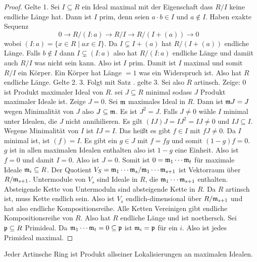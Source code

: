 \begin{proof}
    Gelte 1. Sei \(I\subseteq R\) ein Ideal maximal mit der Eigenschaft dass \(R/I\) keine endliche Länge hat. Dann ist \(I\) prim, denn seien \(a\cdot b\in I\) und \(a\not\in I\). Haben exakte Sequenz
    \[0\to R/(I:a)\to R/I\to R/(I+(a))\to 0\] wobei \((I:a)=\{x\in R\mid ax\in I\}\). Da \(I\subsetneq I+(a)\) hat \(R/(I+(a))\) endliche Länge. Falls \(b\not\in I\) dann \(I\subsetneq (I:a)\) also hat \(R/(I:a)\) endliche Länge und damiit auch \(R/I\) was nicht sein kann. Also ist \(I\) prim. Damit ist \(I\) maximal und somit \(R/I\) ein Körper. Ein Körper hat Länge \(=1\) was ein Widerspruch ist.
    Also hat \(R\) endliche Länge.
    Gelte 2. 3. Folgt mit Satz . gelte 3. Sei also \(R\) artinsch. Zeige: \(0\) ist Produkt maximaler Ideal von \(R\).
    sei \(J\subseteq R\) minimal sodass \(J\) Produkt maximaler Ideale ist. Zeige \(J=0\).
    Sei \(\mathfrak{m} \) maximales Ideal in \(R\). Dann ist \(\mathfrak{m} J=J\) wegen Minimalität von \(J\) also \(J\subseteq \mathfrak{m}\). Es ist \(J^2=J\).
    Falls \(J\neq 0\) wähle \(I\) minimal unter Idealen, die \(J\) nicht annihilieren.
    Es gilt \((IJ)J=IJ^2=IJ\neq 0\) und \(IJ\subseteq I\). Wegene Minimalität von \(I\) ist \(IJ=I\). Das heißt es gibt \(f\in I\) mit \(fJ\neq 0\). Da \(I\) minimal ist, ist \((f)=I\). Es gibt ein \(g\in J\) mit \(f=fg\) und somit \((1-g)f=0\).
    \(g\) ist in allen maximalen Idealen enthalten also ist \(1-g\) eine Einheit. Also ist \(f=0\) und damit \(I=0\). Also ist \(J=0\).
    Somit ist \(0=\mathfrak{m}_1\cdots \mathfrak{m}_t\) für maximale Ideale \(\mathfrak{m}_i\subseteq R\).
    Der Quotient \(V_S=\mathfrak{m}_1\cdots \mathfrak{m}_s/\mathfrak{m}_1\cdots \mathfrak{m}_{s+1}\) ist Vektorraum über \(R/\mathfrak{m}_{s+1}\). Untermodule von \(V_s\) sind Ideale in \(R\), die \(\mathfrak{m}_1\cdots \mathfrak{m}_{s+1}\) enthalten.
    Absteigende Kette von Untermoduln sind absteigende Kette in \(R\). Da \(R\) artinsch ist, muss Kette endlich sein.
    Also ist \(V_s\) endlich-dimensional über \(R/\mathfrak{m}_{s+1}\) und hat also endliche Kompositionsreihe. Alle Ketten Vereinigen gibt endliche Kompositionsreihe von \(R\). Also hat \(R\) endliche Länge und ist noethersch. Sei \(\mathfrak{p}\subseteq R\) Primideal. Da \(\mathfrak{m}_1\cdots \mathfrak{m}_t=0\subseteq \mathfrak{p}\) ist \(\mathfrak{m}_i=\mathfrak{p}\) für ein \(i\). Also ist jedes Primideal maximal.
\end{proof}
\begin{Kor}\label{Kor:StruktArtinring}
    Jeder Artinsche Ring ist Produkt allseiner Lokalisierungen an maximalen Idealen.
\end{Kor}
